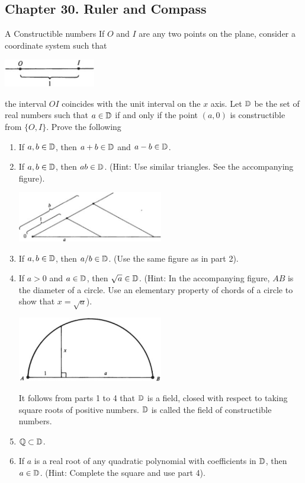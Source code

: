 \subsection*{Chapter 30. Ruler and Compass}


\begin{exercise}{A Constructible numbers}
If $O$ and $I$ are any two points on the plane, consider a coordinate system such that

{\centering\includegraphics[width=0.3\textwidth]{pinter/assets/ch30-a-1.png}\par}

the interval $OI$ coincides with the unit interval on the $x$ axis. Let $\mathbb{D}$ be the set of real numbers such that $a\in\mathbb{D}$ if and only if the point $(a,0)$ is constructible from $\{O,I\}$. Prove the following
\begin{enumerate}
    \item If $a,b\in\mathbb{D}$, then $a+b\in\mathbb{D}$ and $a-b\in\mathbb{D}$.
    \item If $a,b\in\mathbb{D}$, then $ab\in\mathbb{D}$. (Hint: Use similar triangles. See the accompanying figure).
    
    {\centering\includegraphics[width=0.5\textwidth]{pinter/assets/ch30-a-2.png}\par}
    \item If $a,b\in\mathbb{D}$, then $a/b\in\mathbb{D}$. (Use the same figure as in part 2).
    \item If $a>0$ and $a\in\mathbb{D}$, then $\sqrt{a}\in\mathbb{D}$. (Hint: In the accompanying figure, $AB$ is the diameter of a circle. Use an elementary property of chords of a circle to show that $x=\sqrt{a}$).
    
    {\centering\includegraphics[width=0.5\textwidth]{pinter/assets/ch30-a-3.png}\par}

    It follows from parts 1 to 4 that $\mathbb{D}$ is a field, closed with respect to taking square roots of positive numbers. $\mathbb{D}$ is called the field of constructible numbers.
    \item $\mathbb{Q}\subset\mathbb{D}$.
    \item If $a$ is a real root of any quadratic polynomial with coefficients in $\mathbb{D}$, then $a\in\mathbb{D}$. (Hint: Complete the square and use part 4).
\end{enumerate}
\end{exercise}
